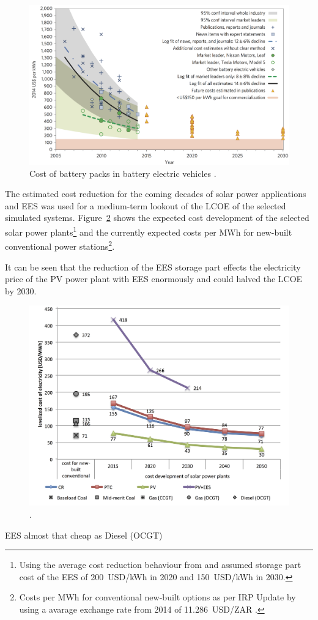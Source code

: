 \begin{figure}[htbp]  
\centering
\includegraphics[width=1\linewidth]{FIG/CostofLi-ion}
\caption[Cost of battery packs in battery electric vehicles.]{Cost of battery packs in battery electric vehicles \cite{Nykvist2015}.}\label{CostofLi-ion}
\end{figure}
The estimated cost reduction for the coming decades of solar power applications and EES was used for a medium-term lookout of the LCOE of the selected simulated systems. Figure~\ref{Costdegrad} shows the expected cost development of the selected solar power plants\footnote{Using the average cost reduction behaviour from \cite{IEA2014c} and assumed storage part cost of the EES of \SI{200}{USD/kWh} in 2020 and \SI{150}{USD/kWh} in 2030.} and the currently expected costs per \si{MWh} for new-built conventional power stations\footnote{Costs per \si{MWh} for conventional new-built options as per IRP Update \cite{CSIR2015a} by using a avarage exchange rate from 2014 of \SI{11.286}{USD/ZAR} \cite{IRS2015}.}. 

It can be seen that the reduction of the EES storage part effects the electricity price of the PV power plant with EES enormously and could halved the LCOE by 2030. 

\begin{figure}[htbp]  
\centering
\includegraphics[width=1\linewidth]{FIG/Costdegrad}
\caption[.]{.}\label{Costdegrad}
\end{figure}

EES almost that cheap as Diesel (OCGT)